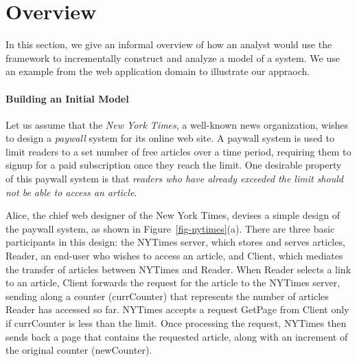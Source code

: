 
\section {Overview}
\label{sec-overview}

In this section, we give an informal overview of how an analyst would
use the framework to incrementally construct and analyze a model of a
system. We use an example from the web application domain to
illustrate our appraoch.

\paragraph{\textbf{Building an Initial Model}} Let us assume that the
\textit{New York Times}, a well-known news organization, wishes to
design a \textit{paywall} system for its online web site. A paywall
system is used to limit readers to a set number of free articles over
a time period, requiring them to signup for a paid subscription once
they reach the limit.   One desirable property of this
paywall system is that \textit{readers who have already exceeded the
  limit should not be able to access an article}.

Alice, the chief web designer of the New York Times, devises a simple
design of the paywall system, as shown in
Figure~\ref{fig-nytimes}(a). There are three basic participants in this
design: the \textsf{NYTimes} server, which stores and serves articles,
\textsf{Reader}, an end-user who wishes to access an article, and
\textsf{Client}, which mediates the transfer of articles between
\textsf{NYTimes} and \textsf{Reader}. When \textsf{Reader} selects a
link to an article, \textsf{Client} forwards the request for the
article to the \textsf{NYTimes} server, sending along a counter
(\textsf{currCounter}) that represents the number of articles
\textsf{Reader} has accessed so far. \textsf{NYTimes} accepts a
request \textsf{GetPage} from \textsf{Client} only if
\textsf{currCounter} is less than the limit. Once processing the
request, \textsf{NYTimes} then sends back a page that contains the
requested article, along with an increment of the original counter
(\textsf{newCounter}).

